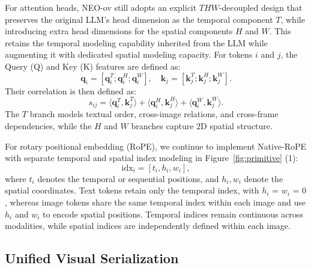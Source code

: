 \documentclass[11pt]{article}
\begin{document}
For attention heads, NEO-ov still adopts an explicit $THW$-decoupled design that preserves the original LLM's head dimension as the temporal component $T$, while introducing extra head dimensions for the spatial components $H$ and $W$. This retains the temporal modeling capability inherited from the LLM while augmenting it with dedicated spatial modeling capacity. For tokens $i$ and $j$, the Query (Q) and Key (K) features are defined as:
\begin{equation}
\mathbf{q}_i=[\mathbf{q}_i^T;\mathbf{q}_i^H;\mathbf{q}_i^W],\quad
\mathbf{k}_j=[\mathbf{k}_j^T;\mathbf{k}_j^H;\mathbf{k}_j^W].
\end{equation}
Their correlation is then defined as:
\begin{equation}
s_{ij}
=
\langle \mathbf{q}_i^T,\mathbf{k}_j^T\rangle
+
\langle \mathbf{q}_i^H,\mathbf{k}_j^H\rangle
+
\langle \mathbf{q}_i^W,\mathbf{k}_j^W\rangle.
\end{equation}
The $T$ branch models textual order, cross-image relations, and cross-frame dependencies, while the $H$ and $W$ branches capture 2D spatial structure. 


For rotary positional embedding (RoPE), we continue to implement Native-RoPE with separate temporal and spatial index modeling in Figure~\ref{fig:primitive} (1):
\begin{equation}
\mathrm{idx}_i = [t_i, h_i, w_i],
\end{equation}
where $t_i$ denotes the temporal or sequential positions, and $h_i, w_i$ denote the spatial coordinates. 
%
Text tokens retain only the temporal index, with $h_i$ = $w_i$ = $0$, whereas image tokens share the same temporal index within each image and use $h_i$ and $w_i$ to encode spatial positions. Temporal indices remain continuous across modalities, while spatial indices are independently defined within each image.

\subsection{Unified Visual Serialization}
\end{document}
